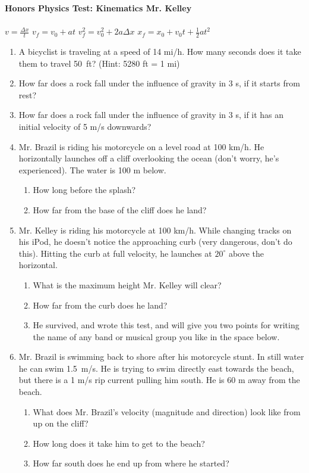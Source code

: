 \documentclass[12pt]{report}
\begin{document}
{\bf{Honors Physics} \hfill {Test: Kinematics} \hfill {Mr. Kelley}} \\ \\
$v = \frac{\Delta x}{t}$ \hfill $v_f = v_0 + at$ \hfill $v_f^2 = v_0^2 + 2 a\Delta x$ \hfill $x_f = x_0 + v_0 t + \frac{1}{2}at^2$


\begin{enumerate}
\item A bicyclist is traveling at a speed of 14 mi/h.  How many seconds does it take them to travel \mbox{50 ft?}  (Hint: 5280 ft = 1 mi)
\vfill
\item How far does a rock fall under the influence of gravity in 3 s, if it starts from rest?
\vfill
\item How far does a rock fall under the influence of gravity in 3 s, if it has an initial velocity of 5 m/s downwards?
\vfill
\pagebreak
\item Mr. Brazil is riding his motorcycle on a level road at 100 km/h.  He horizontally launches off a cliff overlooking the ocean (don't worry, he's experienced).  The water is 100 m below.
\begin{enumerate}
\item How long before the splash?
\vfill
\item How far from the base of the cliff does he land?
\vfill
\end{enumerate}
\pagebreak
\item Mr. Kelley is riding his motorcycle at 100 km/h.  While changing tracks on his iPod, he doesn't notice the approaching curb (very dangerous, don't do this).  Hitting the curb at full velocity, he launches at $20^\circ$ above the horizontal.
\begin{enumerate}
\item What is the maximum height Mr. Kelley will clear?
\vfill
\item How far from the curb does he land?
\vfill
\item He survived, and wrote this test, and will give you two points for writing the name of any band or musical group you like in the space below.
\vspace{3cm}
\end{enumerate}
\pagebreak
\item Mr. Brazil is swimming back to shore after his motorcycle stunt.  In still water he can swim \mbox{1.5 m/s}.  He is trying to swim directly east towards the beach, but there is a 1 m/s rip current pulling him south.  He is 60 m away from the beach.
\begin{enumerate}
\item What does Mr. Brazil's velocity (magnitude and direction) look like from up on the cliff?
\vspace{1cm}
\vfill
\item How long does it take him to get to the beach?
\vfill
\item How far south does he end up from where he started?
\vfill

\end{enumerate}
\end{enumerate}
\end{document}
